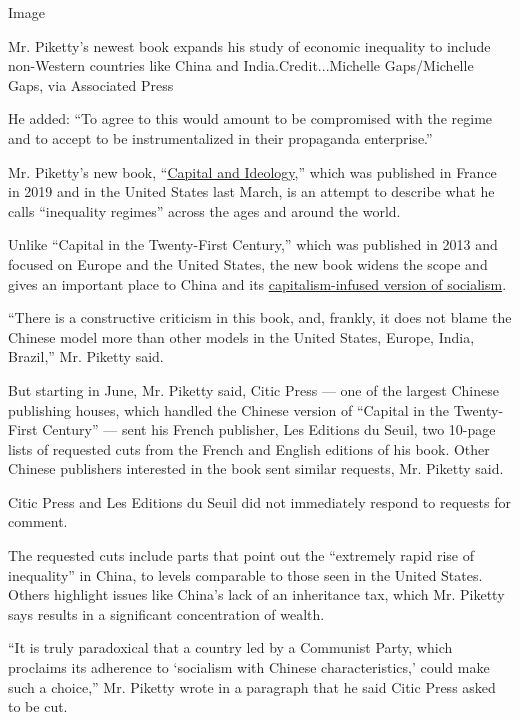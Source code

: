 Image

Mr. Piketty's newest book expands his study of economic inequality to
include non-Western countries like China and India.Credit...Michelle
Gaps/Michelle Gaps, via Associated Press

He added: ``To agree to this would amount to be compromised with the
regime and to accept to be instrumentalized in their propaganda
enterprise.''

Mr. Piketty's new book,
``\href{https://www.nytimes3xbfgragh.onion/2020/03/08/books/review/capital-and-ideology-thomas-piketty.html}{Capital
and Ideology},'' which was published in France in 2019 and in the United
States last March, is an attempt to describe what he calls ``inequality
regimes'' across the ages and around the world.

Unlike ``Capital in the Twenty-First Century,'' which was published in
2013 and focused on Europe and the United States, the new book widens
the scope and gives an important place to China and its
\href{https://www.nytimes3xbfgragh.onion/2018/02/26/world/asia/xi-jinping-thought-explained-a-new-ideology-for-a-new-era.html}{capitalism-infused
version of socialism}.

``There is a constructive criticism in this book, and, frankly, it does
not blame the Chinese model more than other models in the United States,
Europe, India, Brazil,'' Mr. Piketty said.

But starting in June, Mr. Piketty said, Citic Press --- one of the
largest Chinese publishing houses, which handled the Chinese version of
``Capital in the Twenty-First Century'' --- sent his French publisher,
Les Editions du Seuil, two 10-page lists of requested cuts from the
French and English editions of his book. Other Chinese publishers
interested in the book sent similar requests, Mr. Piketty said.

Citic Press and Les Editions du Seuil did not immediately respond to
requests for comment.

The requested cuts include parts that point out the ``extremely rapid
rise of inequality'' in China, to levels comparable to those seen in the
United States. Others highlight issues like China's lack of an
inheritance tax, which Mr. Piketty says results in a significant
concentration of wealth.

``It is truly paradoxical that a country led by a Communist Party, which
proclaims its adherence to `socialism with Chinese characteristics,'
could make such a choice,'' Mr. Piketty wrote in a paragraph that he
said Citic Press asked to be cut.

